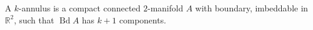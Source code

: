 A $k$-annulus is a compact connected $2$-manifold $A$ with boundary, imbeddable in $\mathbb{R}^2$, such that $\operatorname{Bd} A$ has $k + 1$ components.

